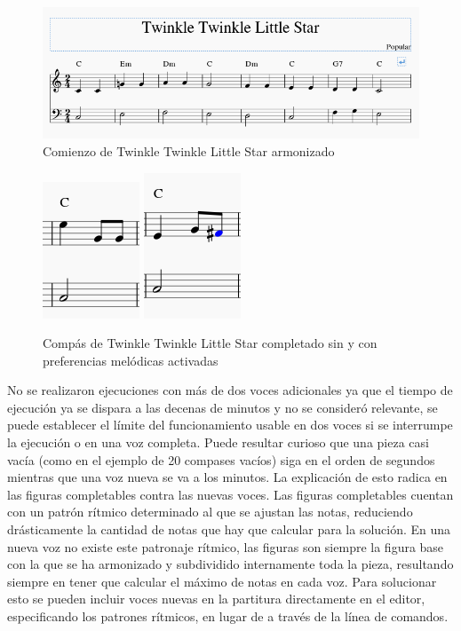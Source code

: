 \begin{figure}
     	\centering
     	\includegraphics[width=0.8\linewidth]{imagenes/evaluation/twinkle_harm.png}
     	\caption{Comienzo de Twinkle Twinkle Little Star armonizado}
     	\label{fig:twinkle_harm}
\end{figure}

\begin{figure}
   	\centering
   	\includegraphics[width=0.2\linewidth,valign=c]{imagenes/evaluation/twinkle_measure.png}
   	\includegraphics[width=0.2\linewidth,valign=c]{imagenes/evaluation/twinkle_measure_melodious.png}
   	\caption{Compás de Twinkle Twinkle Little Star completado sin y con preferencias melódicas activadas}
   	\label{fig:twinkle_measure}
\end{figure}

No se realizaron ejecuciones con más de dos voces adicionales ya que el tiempo de ejecución ya se dispara a las decenas de minutos y no se consideró relevante, se puede establecer el límite del funcionamiento usable en dos voces si se interrumpe la ejecución o en una voz completa. Puede resultar curioso que una pieza casi vacía (como en el ejemplo de 20 compases vacíos) siga en el orden de segundos mientras que una voz nueva se va a los minutos. La explicación de esto radica en las figuras completables contra las nuevas voces. Las figuras completables cuentan con un patrón rítmico determinado al que se ajustan las notas, reduciendo drásticamente la cantidad de notas que hay que calcular para la solución. En una nueva voz no existe este patronaje rítmico, las figuras son siempre la figura base con la que se ha armonizado y subdividido internamente toda la pieza, resultando siempre en tener que calcular el máximo de notas en cada voz. Para solucionar esto se pueden incluir voces nuevas en la partitura directamente en el editor, especificando los patrones rítmicos, en lugar de a través de la línea de comandos.

